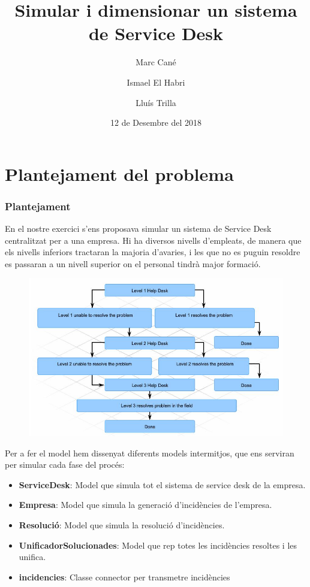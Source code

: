 \documentclass[8pt]{beamer}
\title{Simular i dimensionar un sistema de Service Desk}
\author{Marc Cané \and Ismael El Habri \and Lluís Trilla}
\date[KPT 2004] %
{12 de Desembre del 2018}
\begin{document}
\frame{\titlepage}

\section{Plantejament del problema}
  \begin{frame}
    \frametitle{Plantejament}
    En el nostre exercici s'ens proposava simular un sistema de Service Desk centralitzat per a una empresa. Hi ha diversos nivells d'empleats, de manera que els nivells inferiors tractaran la majoria d'avaries, i les que no es puguin resoldre es passaran a un nivell superior on el personal tindrà major formació.
    \begin{figure}[h!]
      \includegraphics[width=\linewidth]{help-desk-levels.jpg}
      \label{fig:plot1}
    \end{figure}
  \end{frame}
  \begin{frame}
  Per a fer el model hem dissenyat diferents models intermitjos, que ens serviran per simular cada fase del procés:
\begin{itemize}
  \item \textbf{ServiceDesk}: Model que simula tot el sistema de service desk de la empresa.
  \item \textbf{Empresa}: Model que simula la generació d'incidències de l'empresa.
  \item \textbf{Resolució}: Model que simula la resolució d'incidències.
  \item \textbf{UnificadorSolucionades}: Model que rep totes les incidències resoltes i les unifica.
  \item \textbf{incidencies}: Classe connector per transmetre incidències 
\end{itemize}
\end{frame}
\end{document}
